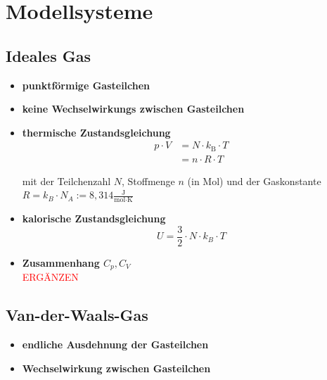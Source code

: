 \documentclass{article}
\begin{document}


\newpage


\section{Modellsysteme}
\subsection{Ideales Gas}
	\begin{itemize}
		\item \textbf{punktförmige Gasteilchen}
		
		
		\item \textbf{keine Wechselwirkungs zwischen Gasteilchen}
	\end{itemize}


	\begin{itemize}
		\item \textbf{thermische Zustandsgleichung}
			\begin{align}
				p \cdot V &= N \cdot k_\text{B} \cdot T \\
				&= n \cdot R \cdot T
			\end{align}
		
		mit der Teilchenzahl $N$, Stoffmenge $n$ \textcolor{gruen}{(in Mol)} und der Gaskonstante $R = k_B \cdot N_A := 8,314 \frac{\text{J}}{\text{mol} \cdot \text{K}}$
		
		
		\item \textbf{kalorische Zustandsgleichung}
			\begin{equation}
				U = \frac{3}{2} \cdot N \cdot k_B \cdot T
			\end{equation}
			
		
		\item \textbf{Zusammenhang $C_p, C_V$}\\
		\textcolor{red}{ERGÄNZEN}
	\end{itemize}


\subsection{Van-der-Waals-Gas}
	\begin{itemize}
		\item \textbf{endliche Ausdehnung der Gasteilchen}
		
		
		\item \textbf{Wechselwirkung zwischen Gasteilchen}
	\end{itemize}
\end{document}
